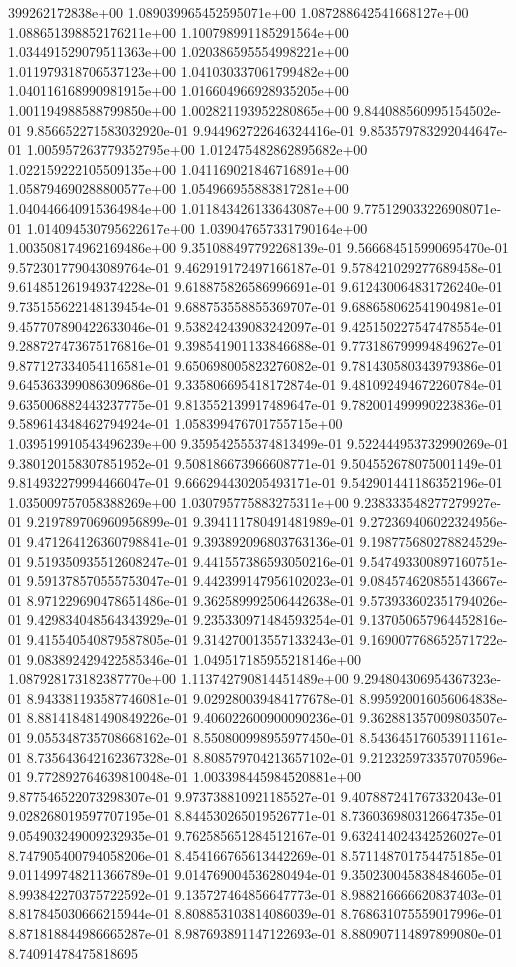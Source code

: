 399262172838e+00	1.089039965452595071e+00	1.087288642541668127e+00	1.088651398852176211e+00	1.100798991185291564e+00	1.034491529079511363e+00	1.020386595554998221e+00	1.011979318706537123e+00	1.041030337061799482e+00	1.040116168990981915e+00	1.016604966928935205e+00	1.001194988588799850e+00	1.002821193952280865e+00	9.844088560995154502e-01	9.856652271583032920e-01	9.944962722646324416e-01	9.853579783292044647e-01	1.005957263779352795e+00	1.012475482862895682e+00	1.022159222105509135e+00	1.041169021846716891e+00	1.058794690288800577e+00	1.054966955883817281e+00	1.040446640915364984e+00	1.011843426133643087e+00	9.775129033226908071e-01	1.014094530795622617e+00	1.039047657331790164e+00	1.003508174962169486e+00	9.351088497792268139e-01	9.566684515990695470e-01	9.572301779043089764e-01	9.462919172497166187e-01	9.578421029277689458e-01	9.614851261949374228e-01	9.618875826586996691e-01	9.612430064831726240e-01	9.735155622148139454e-01	9.688753558855369707e-01	9.688658062541904981e-01	9.457707890422633046e-01	9.538242439083242097e-01	9.425150227547478554e-01	9.288727473675176816e-01	9.398541901133846688e-01	9.773186799994849627e-01	9.877127334054116581e-01	9.650698005823276082e-01	9.781430580343979386e-01	9.645363399086309686e-01	9.335806695418172874e-01	9.481092494672260784e-01	9.635006882443237775e-01	9.813552139917489647e-01	9.782001499990223836e-01	9.589614348462794924e-01	1.058399476701755715e+00	1.039519910543496239e+00	9.359542555374813499e-01	9.522444953732990269e-01	9.380120158307851952e-01	9.508186673966608771e-01	9.504552678075001149e-01	9.814932279994466047e-01	9.666294430205493171e-01	9.542901441186352196e-01	1.035009757058388269e+00	1.030795775883275311e+00	9.238333548277279927e-01	9.219789706960956899e-01	9.394111780491481989e-01	9.272369406022324956e-01	9.471264126360798841e-01	9.393892096803763136e-01	9.198775680278824529e-01	9.519350935512608247e-01	9.441557386593050216e-01	9.547493300897160751e-01	9.591378570555753047e-01	9.442399147956102023e-01	9.084574620855143667e-01	8.971229690478651486e-01	9.362589992506442638e-01	9.573933602351794026e-01	9.429834048564343929e-01	9.235330971484593254e-01	9.137050657964452816e-01	9.415540540879587805e-01	9.314270013557133243e-01	9.169007768652571722e-01	9.083892429422585346e-01	1.049517185955218146e+00	1.087928173182387770e+00	1.113742790814451489e+00	9.294804306954367323e-01	8.943381193587746081e-01	9.029280039484177678e-01	8.995920016056064838e-01	8.881418481490849226e-01	9.406022600900090236e-01	9.362881357009803507e-01	9.055348735708668162e-01	8.550800998955977450e-01	8.543645176053911161e-01	8.735643642162367328e-01	8.808579704213657102e-01	9.212325973357070596e-01	9.772892764639810048e-01	1.003398445984520881e+00	9.877546522073298307e-01	9.973738810921185527e-01	9.407887241767332043e-01	9.028268019597707195e-01	8.844530265019526771e-01	8.736036980312664735e-01	9.054903249009232935e-01	9.762585651284512167e-01	9.632414024342526027e-01	8.747905400794058206e-01	8.454166765613442269e-01	8.571148701754475185e-01	9.011499748211366789e-01	9.014769004536280494e-01	9.350230045838484605e-01	8.993842270375722592e-01	9.135727464856647773e-01	8.988216666620837403e-01	8.817845030666215944e-01	8.808853103814086039e-01	8.768631075559017996e-01	8.871818844986665287e-01	8.987693891147122693e-01	8.880907114897899080e-01	8.74091478475818695